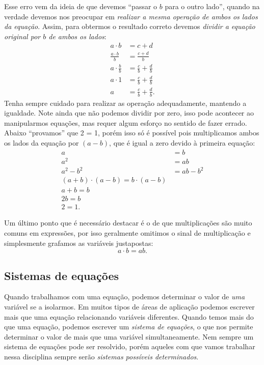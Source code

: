 Esse erro vem da ideia de que devemos ``passar o $b$ para o outro lado'', quando na verdade devemos nos preocupar em \emph{realizar a mesma operação de ambos os lados da equação}. Assim, para obtermos o resultado correto devemos \emph{dividir a equação original por $b$ de ambos os lados}:
\begin{align}
    a \cdot b &= c + d \\
    \frac{a\cdot b}{b} &= \frac{c + d}{b} \\
    a\cdot \frac{b}{b} &= \frac{c}{b} + \frac{d}{b} \\
    a \cdot 1 &= \frac{c}{b} + \frac{d}{b} \\
    a &= \frac{c}{b} + \frac{d}{b}.
\end{align}
%
Tenha sempre cuidado para realizar as operação adequadamente, mantendo a igualdade. Note ainda que não podemos dividir por zero, isso pode acontecer ao manipularmos equações, mas requer algum esforço no sentido de fazer errado. Abaixo ``provamos'' que 2 = 1, porém isso só é possível pois multiplicamos ambos os lados da equação por $(a-b)$, que é igual a zero devido à primeira equação:
\begin{align}
    a &= b \\
    a^2 &= ab \\
    a^2 - b^2 &= ab - b^2 \\
    (a+b)\cdot(a-b) = b\cdot(a-b) \\
    a+b = b \\
    2b = b \\
    2 = 1.
\end{align}

Um último ponto que é necessário destacar é o de que multiplicações são muito comuns em expressões, por isso geralmente omitimos o sinal de multiplicação e simplesmente grafamos as variáveis justapostas:
\begin{equation}
    a\cdot b = ab.
\end{equation}

\subsection{Sistemas de equações}

Quando trabalhamos com uma equação, podemos determinar o valor de \emph{uma} variável se a isolarmos. Em muitos tipos de áreas de aplicação podemos escrever mais que uma equação relacionando variáveis diferentes. Quando temos mais do que uma equação, podemos escrever um \emph{sistema de equações}, o que nos permite determinar o valor de mais que uma variável simultaneamente. Nem sempre um sistema de equações pode ser resolvido, porém aqueles com que vamos trabalhar nessa disciplina sempre serão \emph{sistemas possíveis determinados}.

